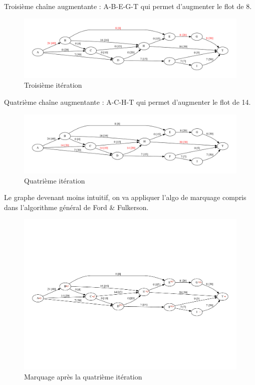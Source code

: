 \documentclass[paper=a4, fontsize=11pt]{scrartcl} %
\numberwithin{equation}{section} %
\numberwithin{figure}{section} %
\numberwithin{table}{section} %
\begin{document}
Troisième chaîne augmentante : A-B-E-G-T qui permet d'augmenter le flot de 8. 

\begin{figure}[h]
\begin{center}
	\includegraphics[width=\textwidth]{figs/reseau-3.pdf}
	\caption{Troisième itération}
	\label{fig:res:3}
\end{center}
\end{figure}

Quatrième chaîne augmentante : A-C-H-T qui permet d'augmenter le flot de 14.

\begin{figure}[h]
\begin{center}
	\includegraphics[width=\textwidth]{figs/reseau-4.pdf}
	\caption{Quatrième itération}
	\label{fig:res:4}
\end{center}
\end{figure}

Le graphe devenant moins intuitif, on va appliquer l'algo de marquage compris dans l'algorithme général de Ford \& Fulkerson.

\begin{figure}[h]
\begin{center}
	\includegraphics[width=\textwidth]{figs/reseau-4m.pdf}
	\caption{Marquage après la quatrième itération}
	\label{fig:res:4m}
\end{center}
\end{figure}
\end{document}
